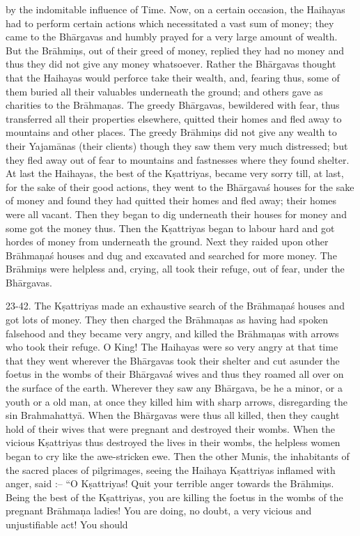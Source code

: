 by the indomitable influence of Time. Now, on a certain occasion, the Haihayas had to perform certain actions which necessitated a vast sum of money; they came to the Bh\=argavas and humbly prayed for a very large amount of wealth. But the Br\=ahmi\d{n}s, out of their greed of money, replied they had no money and thus they did not give any money whatsoever. Rather the Bh\=argavas thought that the Haihayas would perforce take their wealth, and, fearing thus, some of them buried all their valuables underneath the ground; and others gave as charities to the Br\=ahma\d{n}as. The greedy Bh\=argavas, bewildered with fear, thus transferred all their properties elsewhere, quitted their homes and fled away to mountains and other places. The greedy Br\=ahmi\d{n}s did not give any wealth to their Yajam\=anas (their clients) though they saw them very much distressed; but they fled away out of fear to mountains and fastnesses where they found shelter. At last the Haihayas, the best of the K\d{s}attriyas, became very sorry till, at last, for the sake of their good actions, they went to the Bh\=argava\'s houses for the sake of money and found they had quitted their homes and fled away; their homes were all vacant. Then they began to dig underneath their houses for money and some got the money thus. Then the K\d{s}attriyas began to labour hard and got hordes of money from underneath the ground. Next they raided upon other Br\=ahma\d{n}a\'s houses and dug and excavated and searched for more money. The Br\=ahmi\d{n}s were helpless and, crying, all took their refuge, out of fear, under the Bh\=argavas.

23-42. The K\d{s}attriyas made an exhaustive search of the Br\=ahma\d{n}a\'s houses and got lots of money. They then charged the Br\=ahma\d{n}as as having had spoken falsehood and they became very angry, and killed the Br\=ahma\d{n}as with arrows who took their refuge. O King! The Haihayas were so very angry at that time that they went wherever the Bh\=argavas took their shelter and cut asunder the foetus in the wombs of their Bh\=argava\'s wives and thus they roamed all over on the surface of the earth. Wherever they saw any Bh\=argava, be he a minor, or a youth or a old man, at once they killed him with sharp arrows, disregarding the sin Brahmahatty\=a. When the Bh\=argavas were thus all killed, then they caught hold of their wives that were pregnant and destroyed their wombs. When the vicious K\d{s}attriyas thus destroyed the lives in their wombs, the helpless women began to cry like the awe-stricken ewe. Then the other Munis, the inhabitants of the sacred places of pilgrimages, seeing the Haihaya K\d{s}attriyas inflamed with anger, said :-- ``O K\d{s}attriyas! Quit your terrible anger towards the Br\=ahmi\d{n}s. Being the best of the K\d{s}attriyas, you are killing the foetus in the wombs of the pregnant Br\=ahma\d{n}a ladies! You are doing, no doubt, a very vicious and unjustifiable act! You should

